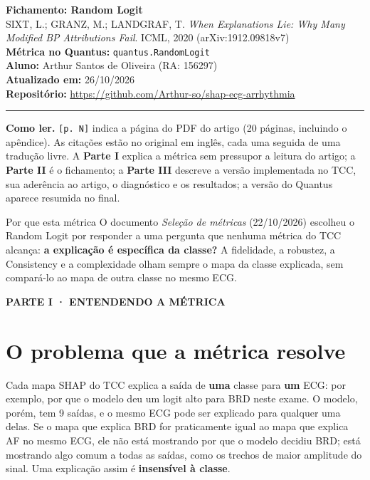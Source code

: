 \documentclass[11pt,a4paper]{article}
\newcommand{\partbar}[1]{\par\vspace{1.2em}\noindent\colorbox{black!80}{\parbox{\dimexpr\linewidth-2\fboxsep}{\color{white}\bfseries\sffamily\MakeUppercase{#1}}}\par\vspace{0.4em}}
\begin{document}
\begin{center}
    {\LARGE \textbf{Fichamento: Random Logit}} \\[0.35em]
    {\large SIXT, L.; GRANZ, M.; LANDGRAF, T. \textit{When Explanations Lie: Why Many Modified BP Attributions Fail}. ICML, 2020 (arXiv:1912.09818v7)} \\[0.3em]
    \textbf{Métrica no Quantus:} \texttt{quantus.RandomLogit} \\[0.2em]
    \textbf{Aluno:} Arthur Santos de Oliveira (RA: 156297) \\[0.2em]
    \textbf{Atualizado em:} 26/10/2026 \\[0.2em]
    \textbf{Repositório:} \url{https://github.com/Arthur-so/shap-ecg-arrhythmia}
\end{center}
\vspace{-0.5em}
\hrule
\vspace{0.8em}

\textbf{Como ler.} \texttt{[p. N]} indica a página do PDF do artigo (20 páginas, incluindo o apêndice). As citações estão no original em inglês, cada uma seguida de uma tradução livre. A \textbf{Parte I} explica a métrica sem pressupor a leitura do artigo; a \textbf{Parte II} é o fichamento; a \textbf{Parte III} descreve a versão implementada no TCC, sua aderência ao artigo, o diagnóstico e os resultados; a versão do Quantus aparece resumida no final.

\begin{infobox}[note]{Por que esta métrica}
O documento \textit{Seleção de métricas} (22/10/2026) escolheu o Random Logit por responder a uma pergunta que nenhuma métrica do TCC alcança: \textbf{a explicação é específica da classe?} A fidelidade, a robustez, a Consistency e a complexidade olham sempre o mapa da classe explicada, sem compará-lo ao mapa de outra classe no mesmo ECG.
\end{infobox}

\partbar{Parte I · Entendendo a métrica}

\section{O problema que a métrica resolve}
Cada mapa SHAP do TCC explica a saída de \textbf{uma} classe para \textbf{um} ECG: por exemplo, por que o modelo deu um logit alto para BRD neste exame. O modelo, porém, tem 9 saídas, e o mesmo ECG pode ser explicado para qualquer uma delas. Se o mapa que explica BRD for praticamente igual ao mapa que explica AF no mesmo ECG, ele não está mostrando por que o modelo decidiu BRD; está mostrando algo comum a todas as saídas, como os trechos de maior amplitude do sinal. Uma explicação assim é \textbf{insensível à classe}.
\end{document}
